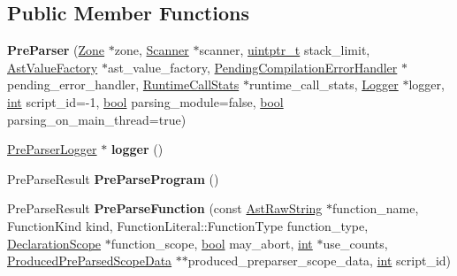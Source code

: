 \subsection*{Public Member Functions}
\begin{DoxyCompactItemize}
\item 
\mbox{\label{classv8_1_1internal_1_1PreParser_a058c34c9f7cf51c66e037e903d6dbf71}} 
{\bfseries Pre\+Parser} (\mbox{\hyperlink{classv8_1_1internal_1_1Zone}{Zone}} $\ast$zone, \mbox{\hyperlink{classv8_1_1internal_1_1Scanner}{Scanner}} $\ast$scanner, \mbox{\hyperlink{classuintptr__t}{uintptr\+\_\+t}} stack\+\_\+limit, \mbox{\hyperlink{classv8_1_1internal_1_1AstValueFactory}{Ast\+Value\+Factory}} $\ast$ast\+\_\+value\+\_\+factory, \mbox{\hyperlink{classv8_1_1internal_1_1PendingCompilationErrorHandler}{Pending\+Compilation\+Error\+Handler}} $\ast$pending\+\_\+error\+\_\+handler, \mbox{\hyperlink{classv8_1_1internal_1_1RuntimeCallStats}{Runtime\+Call\+Stats}} $\ast$runtime\+\_\+call\+\_\+stats, \mbox{\hyperlink{classv8_1_1internal_1_1Logger}{Logger}} $\ast$logger, \mbox{\hyperlink{classint}{int}} script\+\_\+id=-\/1, \mbox{\hyperlink{classbool}{bool}} parsing\+\_\+module=false, \mbox{\hyperlink{classbool}{bool}} parsing\+\_\+on\+\_\+main\+\_\+thread=true)
\item 
\mbox{\label{classv8_1_1internal_1_1PreParser_a37e6e689186722143ca2d1b20a9cb28a}} 
\mbox{\hyperlink{classv8_1_1internal_1_1PreParserLogger}{Pre\+Parser\+Logger}} $\ast$ {\bfseries logger} ()
\item 
\mbox{\label{classv8_1_1internal_1_1PreParser_a797eb485607cc71f946606f1033e3fcb}} 
Pre\+Parse\+Result {\bfseries Pre\+Parse\+Program} ()
\item 
\mbox{\label{classv8_1_1internal_1_1PreParser_a339d337fc67d7763babb835a58b513a2}} 
Pre\+Parse\+Result {\bfseries Pre\+Parse\+Function} (const \mbox{\hyperlink{classv8_1_1internal_1_1AstRawString}{Ast\+Raw\+String}} $\ast$function\+\_\+name, Function\+Kind kind, Function\+Literal\+::\+Function\+Type function\+\_\+type, \mbox{\hyperlink{classv8_1_1internal_1_1DeclarationScope}{Declaration\+Scope}} $\ast$function\+\_\+scope, \mbox{\hyperlink{classbool}{bool}} may\+\_\+abort, \mbox{\hyperlink{classint}{int}} $\ast$use\+\_\+counts, \mbox{\hyperlink{classv8_1_1internal_1_1ProducedPreParsedScopeData}{Produced\+Pre\+Parsed\+Scope\+Data}} $\ast$$\ast$produced\+\_\+preparser\+\_\+scope\+\_\+data, \mbox{\hyperlink{classint}{int}} script\+\_\+id)
$$
\end{DoxyCompactItemize}
